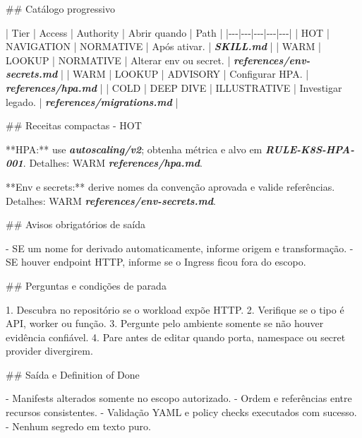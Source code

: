 \documentclass[
  10pt,
  a4paper,
  oneside]{book}
\newenvironment{Shaded}{}{}
\newcommand{\FunctionTok}[1]{\textcolor[rgb]{0.02,0.16,0.49}{#1}}
\newcommand{\InformationTok}[1]{\textcolor[rgb]{0.38,0.63,0.69}{\textbf{\textit{#1}}}}
\newcommand{\NormalTok}[1]{#1}
\newcommand{\SpecialStringTok}[1]{\textcolor[rgb]{0.73,0.40,0.53}{#1}}
\begin{document}
\begin{Shaded}
\begin{Highlighting}[]
\FunctionTok{\#\# Catálogo progressivo}

\NormalTok{| Tier | Access | Authority | Abrir quando | Path |}
\NormalTok{|{-}{-}{-}|{-}{-}{-}|{-}{-}{-}|{-}{-}{-}|{-}{-}{-}|}
\NormalTok{| HOT | NAVIGATION | NORMATIVE | Após ativar. | }\InformationTok{\textasciigrave{}SKILL.md\textasciigrave{}}\NormalTok{ |}
\NormalTok{| WARM | LOOKUP | NORMATIVE | Alterar env ou secret. | }\InformationTok{\textasciigrave{}references/env{-}secrets.md\textasciigrave{}}\NormalTok{ |}
\NormalTok{| WARM | LOOKUP | ADVISORY | Configurar HPA. | }\InformationTok{\textasciigrave{}references/hpa.md\textasciigrave{}}\NormalTok{ |}
\NormalTok{| COLD | DEEP DIVE | ILLUSTRATIVE | Investigar legado. | }\InformationTok{\textasciigrave{}references/migrations.md\textasciigrave{}}\NormalTok{ |}

\FunctionTok{\#\# Receitas compactas {-} HOT}

\NormalTok{**HPA:** use }\InformationTok{\textasciigrave{}autoscaling/v2\textasciigrave{}}\NormalTok{; obtenha métrica e alvo em}
\InformationTok{\textasciigrave{}RULE{-}K8S{-}HPA{-}001\textasciigrave{}}\NormalTok{. Detalhes: WARM }\InformationTok{\textasciigrave{}references/hpa.md\textasciigrave{}}\NormalTok{.}

\NormalTok{**Env e secrets:** derive nomes da convenção aprovada e valide referências.}
\NormalTok{Detalhes: WARM }\InformationTok{\textasciigrave{}references/env{-}secrets.md\textasciigrave{}}\NormalTok{.}

\FunctionTok{\#\# Avisos obrigatórios de saída}

\SpecialStringTok{{-} }\NormalTok{SE um nome for derivado automaticamente, informe origem e transformação.}
\SpecialStringTok{{-} }\NormalTok{SE houver endpoint HTTP, informe se o Ingress ficou fora do escopo.}

\FunctionTok{\#\# Perguntas e condições de parada}

\SpecialStringTok{1. }\NormalTok{Descubra no repositório se o workload expõe HTTP.}
\SpecialStringTok{2. }\NormalTok{Verifique se o tipo é API, worker ou função.}
\SpecialStringTok{3. }\NormalTok{Pergunte pelo ambiente somente se não houver evidência confiável.}
\SpecialStringTok{4. }\NormalTok{Pare antes de editar quando porta, namespace ou secret provider divergirem.}

\FunctionTok{\#\# Saída e Definition of Done}

\SpecialStringTok{{-} }\NormalTok{Manifests alterados somente no escopo autorizado.}
\SpecialStringTok{{-} }\NormalTok{Ordem e referências entre recursos consistentes.}
\SpecialStringTok{{-} }\NormalTok{Validação YAML e policy checks executados com sucesso.}
\SpecialStringTok{{-} }\NormalTok{Nenhum segredo em texto puro.}


\end{Highlighting}
\end{Shaded}
\end{document}
